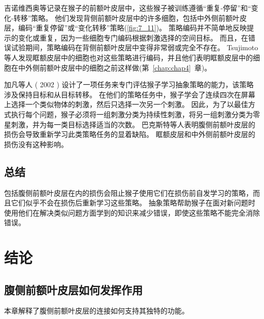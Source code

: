 吉诺维西奥等\cite{genovesio2005prefrontal}记录在猴子的前额叶皮层中，这些猴子被训练遵循“重复-停留”和“变化-转移”策略。
他们发现背侧前额叶皮层中的许多细胞，包括中外侧前额叶皮层，编码“重复停留”或“变化转移”策略(\ref{fig:7_11})。
策略编码并不简单地反映提示的变化或重复，因为一些细胞专门编码根据刺激选择的空间目标。
而且，在错误试验期间，策略编码在背侧前额叶皮层中变得非常弱或完全不存在\cite{genovesio2008encoding}。
Tsujimoto 等人\cite{tsujimoto2011comparison}发现眶额皮层中的细胞也对这些策略进行编码，并且他们表明眶额皮层中的细胞在中外侧前额叶皮层中的细胞之前这样做(第~\ref{chap:chap4}~章)。
\par 


加凡等人 ( 2002 ) 设计了一项任务来专门评估猴子学习抽象策略的能力，该策略涉及保持目标和从目标转移。
在他们的策略任务中，猴子学会了连续四次在屏幕上选择一个类似物体的刺激，然后只选择一次另一个刺激。
因此，为了以最佳方式执行每个问题，猴子必须将一组刺激分类为持续性刺激，将另一组刺激分类为零星刺激，并为每一类目标选择适当的次数。 
巴克斯特等人\cite{baxter2009ventrolateral}表明腹侧前额叶皮层的损伤会导致重新学习此类策略任务的显着缺陷。 
眶额皮层\cite{baxter2007orbital}和中外侧前额叶皮层\cite{baxter2008dorsolateral}的损伤没有这种影响。



\subsection{总结}
\par 
包括腹侧前额叶皮层在内的损伤会阻止猴子使用它们在损伤前自发学习的策略，而且它们似乎不会在损伤后重新学习这些策略。
抽象策略帮助猴子在面对新问题时使用他们在解决类似问题方面学到的知识来减少错误，即使这些策略不能完全消除错误。



\section{结论}

\subsection{腹侧前额叶皮层如何发挥作用}
\par

本章解释了腹侧前额叶皮层的连接如何支持其独特的功能。


